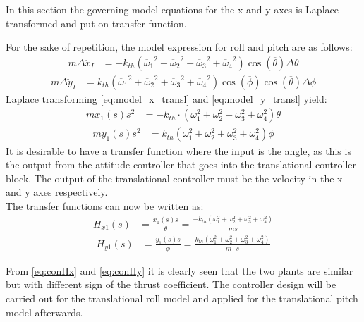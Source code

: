In this section the governing model equations for the x and y axes is Laplace transformed and put on transfer function. 

For the sake of repetition, the model expression for roll and pitch are as follows:
\begin{align}
m\Delta\ddot{x}_I&= -k_{th}({\overline{\omega}_1}^2+{\overline{\omega}_2}^2+{\overline{\omega}_3}^2+{\overline{\omega}_4}^2)\cos(\overline{\theta})\Delta\theta \label{eq:model_x_transl}
\end{align}
\begin{align}
m\Delta\ddot{y}_I&= k_{th}({\overline{\omega}_1}^2+{\overline{\omega}_2}^2+{\overline{\omega}_3}^2+{\overline{\omega}_4}^2)\cos(\overline{\phi})\cos(\overline{\theta})\Delta\phi 
\label{eq:model_y_transl}
\end{align} 
Laplace transforming \autoref{eq:model_x_transl} and \ref{eq:model_y_transl} yield:
\begin{align}
m x_1(s)s^2&=-k_{th}\cdot (\omega_1 ^2 + \omega_2 ^2 + \omega_3 ^2 + \omega_4 ^2) \theta
\end{align}
\begin{align}
m y_1(s) s^2&= k_{th} (\omega_1 ^2 + \omega_2 ^2 + \omega_3 ^2 + \omega_4 ^2)\phi
\end{align}
It is desirable to have a transfer function where the input is the angle, as this is the output from the attitude controller that goes into the translational controller block. The output of the translational controller must be the velocity in the x and y axes respectively. \\
The transfer functions can now be written as:
\begin{align}
H_{x1}(s)&=\frac{x_1(s) s}{\theta}=\frac{-k_{th} (\omega_1 ^2 + \omega_2 ^2 + \omega_3 ^2 + \omega_4 ^2)}{m s}\label{eq:conHx}
\end{align}
\begin{align}
H_{y1}(s)&=\frac{y_1(s) s}{\phi}=\frac{k_{th}(\omega_1 ^2 + \omega_2 ^2 + \omega_3 ^2 + \omega_4 ^2)}{m\cdot s}
\label{eq:conHy}
\end{align}
\begin{where}
\end{where}

From \autoref{eq:conHx} and \ref{eq:conHy} it is clearly seen that the two plants are similar but with different sign of the thrust coefficient. The controller design will be carried out for the translational roll model and applied for the translational pitch model  afterwards.

